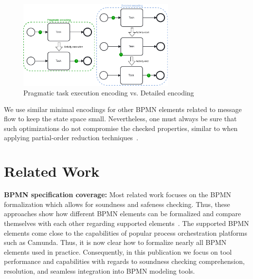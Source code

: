 \documentclass[runningheads]{llncs}
\begin{document}
\begin{figure}[ht]
	\centering
	\includegraphics[width=0.7\textwidth]{images/pragmatic-encoding}
	\caption{Pragmatic task execution encoding vs. Detailed encoding}
	\label{fig:activityEncoding}
\end{figure}

We use similar minimal encodings for other BPMN elements related to message flow to keep the state space small.
Nevertheless, one must always be sure that such optimizations do not compromise the checked properties, similar to when applying partial-order reduction techniques~\cite{valmariStateExplosionProblem1998}.

\section{Related Work}

\textbf{BPMN specification coverage:}
Most related work focuses on the BPMN formalization which allows for soundness and safeness checking.
Thus, these approaches show how different BPMN elements can be formalized and compare themselves with each other regarding supported elements~\cite{corradiniFormalApproachAnalysis2021,houhouFirstOrderLogicVerification2022,krauterFormalizationAnalysisBPMN2023,krauterHigherorderTransformationApproach2023}.
The supported BPMN elements come close to the capabilities of popular process orchestration platforms such as Camunda.
Thus, it is now clear how to formalize nearly all BPMN elements used in practice.
Consequently, in this publication we focus on tool performance and capabilities with regards to soundness checking comprehension, resolution, and seamless integration into BPMN modeling tools.
\end{document}
